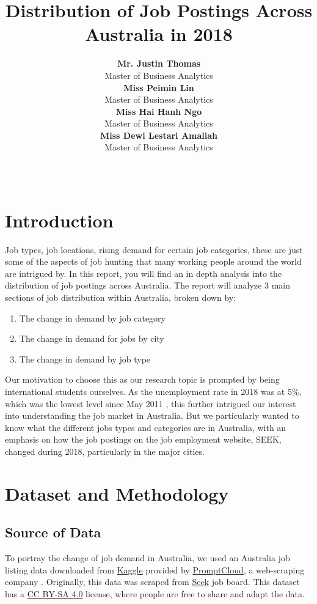 \documentclass[11pt,a4paper,]{article}
\title{Distribution of Job Postings Across Australia in 2018}
\author{\sf\Large\textbf{Mr. Justin Thomas}\\ {\sf\large Master of Business Analytics\\[0.5cm]} \sf\Large\textbf{Miss Peimin Lin}\\ {\sf\large Master of Business Analytics\\[0.5cm]} \sf\Large\textbf{Miss Hai Hanh Ngo}\\ {\sf\large Master of Business Analytics\\[0.5cm]} \sf\Large\textbf{Miss Dewi Lestari Amaliah}\\ {\sf\large Master of Business Analytics\\[0.5cm]}}
\date{\sf\Date~\Month~\Year}
\makeatletter
\providecommand{\tightlist}{%
  \setlength{\itemsep}{0pt}\setlength{\parskip}{0pt}}
\def\titlepage{\front{\expandafter{\@title}}{\@author}{\@organization}}
\makeatother
\begin{document}
\titlepage

{
\setcounter{tocdepth}{2}
\tableofcontents
}
\clearpage

\hypertarget{introduction}{%
\section{Introduction}\label{introduction}}

Job types, job locations, rising demand for certain job categories, these are just some of the aspects of job hunting that many working people around the world are intrigued by. In this report, you will find an in depth analysis into the distribution of job postings across Australia. The report will analyze 3 main sections of job distribution within Australia, broken down by:

\begin{enumerate}
\def\labelenumi{\arabic{enumi})}
\tightlist
\item
  The change in demand by job category
\item
  The change in demand for jobs by city
\item
  The change in demand by job type
\end{enumerate}

Our motivation to choose this as our research topic is prompted by being international students ourselves. As the unemployment rate in 2018 was at 5\%, which was the lowest level since May 2011 \textcite{unemployment}, this further intrigued our interest into understanding the job market in Australia. But we particularly wanted to know what the different jobs types and categories are in Australia, with an emphasis on how the job postings on the job employment website, SEEK, changed during 2018, particularly in the major cities.

\hypertarget{dataset-and-methodology}{%
\section{Dataset and Methodology}\label{dataset-and-methodology}}

\hypertarget{source-of-data}{%
\subsection{Source of Data}\label{source-of-data}}

To portray the change of job demand in Australia, we used an Australia job listing data downloaded from \href{https://www.kaggle.com/PromptCloudHQ/australian-job-listings-data-from-seek-job-board}{Kaggle} provided by \href{https://www.promptcloud.com}{PromptCloud}, a web-scraping company \autocite{Kaggle}. Originally, this data was scraped from \href{https://www.seek.com.au}{Seek} job board. This dataset has a \href{https://creativecommons.org/licenses/by-sa/4.0/}{CC BY-SA 4.0} license, where people are free to share and adapt the data.
\end{document}
